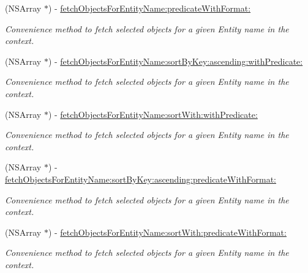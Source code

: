 \begin{DoxyCompactItemize}
(N\-S\-Array $\ast$) -\/ \hyperlink{category_n_s_managed_object_context_07_easy_fetch_08_a7536a8a1772ea1ac764f7be2e4a52b91}{fetch\-Objects\-For\-Entity\-Name\-:predicate\-With\-Format\-:}
\begin{DoxyCompactList}\small\item\em Convenience method to fetch selected objects for a given Entity name in the context. \end{DoxyCompactList}\item 
(N\-S\-Array $\ast$) -\/ \hyperlink{category_n_s_managed_object_context_07_easy_fetch_08_afbf7d7f0f85dcb89d1aefe10473fe768}{fetch\-Objects\-For\-Entity\-Name\-:sort\-By\-Key\-:ascending\-:with\-Predicate\-:}
\begin{DoxyCompactList}\small\item\em Convenience method to fetch selected objects for a given Entity name in the context. \end{DoxyCompactList}\item 
(N\-S\-Array $\ast$) -\/ \hyperlink{category_n_s_managed_object_context_07_easy_fetch_08_a81a39510975227e2b59590c896594c9b}{fetch\-Objects\-For\-Entity\-Name\-:sort\-With\-:with\-Predicate\-:}
\begin{DoxyCompactList}\small\item\em Convenience method to fetch selected objects for a given Entity name in the context. \end{DoxyCompactList}\item 
(N\-S\-Array $\ast$) -\/ \hyperlink{category_n_s_managed_object_context_07_easy_fetch_08_ae196545cff766c2d33c51bfd5899a40f}{fetch\-Objects\-For\-Entity\-Name\-:sort\-By\-Key\-:ascending\-:predicate\-With\-Format\-:}
\begin{DoxyCompactList}\small\item\em Convenience method to fetch selected objects for a given Entity name in the context. \end{DoxyCompactList}\item 
(N\-S\-Array $\ast$) -\/ \hyperlink{category_n_s_managed_object_context_07_easy_fetch_08_a708b89e7fdc5b553424f1c6cad73e193}{fetch\-Objects\-For\-Entity\-Name\-:sort\-With\-:predicate\-With\-Format\-:}
\begin{DoxyCompactList}\small\item\em Convenience method to fetch selected objects for a given Entity name in the context. \end{DoxyCompactList}\end{DoxyCompactItemize}
